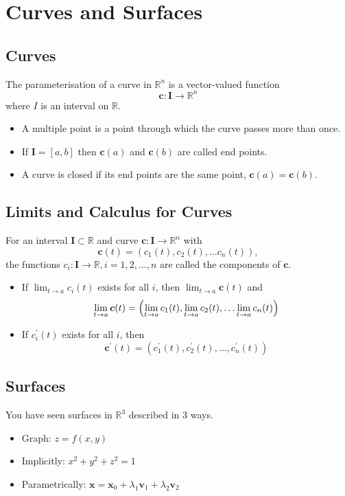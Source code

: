 
\section{Curves and Surfaces}

\subsection{Curves}
The parameterisation of a curve in \(\mathbb{R}^n\) is a vector-valued function
\[\boldsymbol{c} : \boldsymbol{I} \rightarrow \mathbb{R}^n\]
where \(I\) is an interval on \(\mathbb{R}\).
\begin{itemize}
    \item A multiple point is a point through which the curve passes more than once.
    \item If \(\boldsymbol{I} = [a, b]\) then \(\boldsymbol{c}(a)\) and \(\boldsymbol{c}(b)\)
    are called end points.
    \item A curve is closed if its end points are the same point,
    \(\boldsymbol{c}(a) = \boldsymbol{c}(b)\).
\end{itemize}

\subsection{Limits and Calculus for Curves}
For an interval \(\boldsymbol{I} \subset \mathbb{R}\) and curve \(\boldsymbol{c}: \boldsymbol{I}
\rightarrow \mathbb{R}^n\) with
\[\boldsymbol{c}(t) = (c_1(t), c_2(t), \dots c_n(t)),\]
the functions \(c_i: \boldsymbol{I} \rightarrow \mathbb{R}, i = 1,2, \dots, n\) are called
the components of \(\boldsymbol{c}\).
\begin{itemize}
    \item If \(\lim_{t\to a} c_i(t)\) exists for all \(i\), then \(\lim_{t\to a} 
    \boldsymbol{c}(t)\) and 
    \[\lim_{t\to a}\boldsymbol{c}(t) = \Bigl(\lim_{t\to a}c_1(t), \lim_{t\to a}c_2(t), \dots
    \lim_{t\to a} c_n(t)\Bigl)\]
    \item If \(c_i^\prime(t)\) exists for all \(i\), then
    \[\boldsymbol{c}^\prime(t) = (c^\prime_1(t), c^\prime_2(t), \dots, c^\prime_n(t))\]
\end{itemize}

\subsection{Surfaces}
You have seen surfaces in \(\mathbb{R}^3\) described in 3 ways.
\begin{itemize}
    \item Graph: \(z = f(x, y)\)
    \item Implicitly: \(x^2+y^2+z^2 = 1\)
    \item Parametrically: 
    \(\textbf{x} = \textbf{x}_0 + \lambda_1\textbf{v}_1 + \lambda_2\textbf{v}_2\)
\end{itemize}
